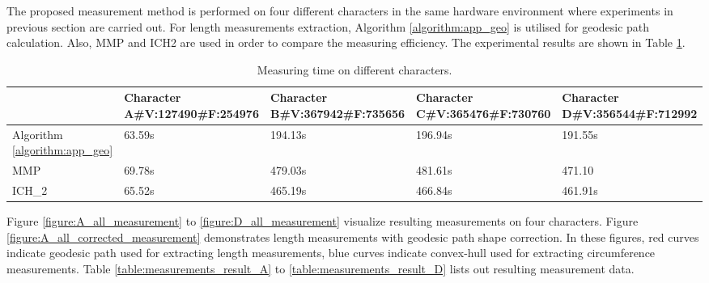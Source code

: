The proposed measurement method is performed on four different characters in the same hardware environment where experiments in previous section are carried out. For length measurements extraction, Algorithm \ref{algorithm:app_geo} is utilised for geodesic path calculation. Also, MMP and ICH2 are used in order to compare the measuring efficiency. The experimental results are shown in Table \ref{table:measurements_time}.

\begin{table}[H]
    \centering
    \begin{tabular}{|p{2.5cm}|p{2cm}|p{2cm}|p{2cm}|p{2cm}|}
        \hline
        & Character A\newline\#V:127490\newline\#F:254976 & Character B\newline\#V:367942\newline\#F:735656 & Character C\newline\#V:365476\newline\#F:730760 & Character D\newline\#V:356544\newline\#F:712992\\
        
    \hline    
    Algorithm \ref{algorithm:app_geo} & 63.59s & 194.13s & 196.94s & 191.55s\\
    \hline
    MMP & 69.78s & 479.03s & 481.61s & 471.10\\
    \hline
    ICH\_2 & 65.52s & 465.19s & 466.84s & 461.91s\\
    \hline    
    \end{tabular}
    \caption{Measuring time on different characters.} %
    \label{table:measurements_time}
\end{table}

Figure \ref{figure:A_all_measurement} to \ref{figure:D_all_measurement} visualize resulting measurements on four characters. Figure \ref{figure:A_all_corrected_measurement} demonstrates length measurements with geodesic path shape correction. In these figures, red curves indicate geodesic path used for extracting length measurements, blue curves indicate convex-hull used for extracting circumference measurements. Table \ref{table:measurements_result_A} to \ref{table:measurements_result_D} lists out resulting measurement data. 
 
